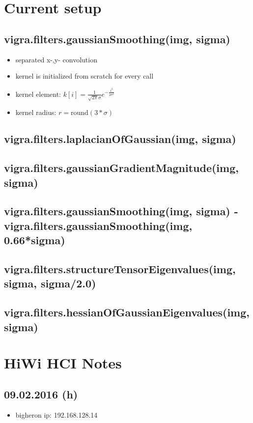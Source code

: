 \documentclass[12pt,a4paper]{article}
\begin{document}
\section{Current setup}
  \subsection{vigra.filters.gaussianSmoothing(img, sigma)}
    \begin{itemize}
      \item separated x-,y- convolution
      \item kernel is initialized from scratch for every call
      \item kernel element: $k[i] = \frac{1}{\sqrt{2\pi}\sigma} e^{-\frac{i^2}{2\sigma^2}} $
      \item kernel radius: $r = \textrm{round}(3*\sigma)$
    \end{itemize}
  \subsection{vigra.filters.laplacianOfGaussian(img, sigma)}
  \subsection{vigra.filters.gaussianGradientMagnitude(img, sigma)}
  \subsection{vigra.filters.gaussianSmoothing(img, sigma) - vigra.filters.gaussianSmoothing(img, 0.66*sigma)}
  \subsection{vigra.filters.structureTensorEigenvalues(img, sigma, sigma/2.0)}
  \subsection{vigra.filters.hessianOfGaussianEigenvalues(img, sigma)}


\section{HiWi HCI Notes}

\subsection{09.02.2016 (h)}
  \begin{itemize}
    \item bigheron ip: 192.168.128.14
  \end{itemize}
  
\end{document}
